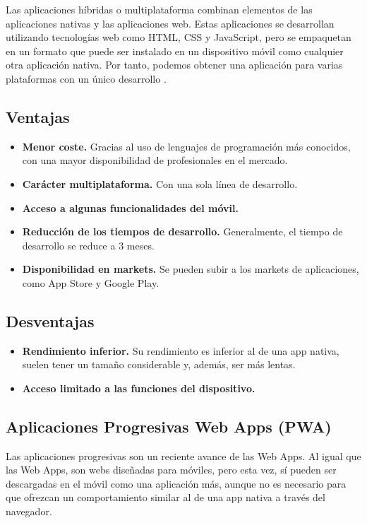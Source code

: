 Las aplicaciones híbridas o multiplataforma combinan elementos de las aplicaciones nativas y las aplicaciones web. Estas aplicaciones se desarrollan utilizando tecnologías web como HTML, CSS y JavaScript, pero se empaquetan en un formato que puede ser instalado en un dispositivo móvil como cualquier otra aplicación nativa. Por tanto, podemos obtener una aplicación para varias plataformas con un único desarrollo \cite{IM1}.

\subsection*{Ventajas}
\begin{itemize}
	\item \textbf{Menor coste.} Gracias al uso de lenguajes de programación más conocidos, con una mayor disponibilidad de profesionales en el mercado.
	\item \textbf{Carácter multiplataforma.} Con una sola línea de desarrollo.
	\item \textbf{Acceso a algunas funcionalidades del móvil.}
	\item \textbf{Reducción de los tiempos de desarrollo.} Generalmente, el tiempo de desarrollo se reduce a 3 meses.
	\item \textbf{Disponibilidad en markets.} Se pueden subir a los markets de aplicaciones, como App Store y Google Play.
\end{itemize}

\subsection*{Desventajas}
\begin{itemize}
	\item \textbf{Rendimiento inferior.} Su rendimiento es inferior al de una app nativa, suelen tener un tamaño considerable y, además, ser más lentas.
	\item \textbf{Acceso limitado a las funciones del dispositivo.}
\end{itemize}

\subsection{Aplicaciones Progresivas Web Apps (PWA)}

Las aplicaciones progresivas son un reciente avance de las Web Apps. Al igual que las Web Apps, son webs diseñadas para móviles, pero esta vez, sí pueden ser descargadas en el móvil como una aplicación más, aunque no es necesario para que ofrezcan un comportamiento similar al de una app nativa a través del navegador. \\

